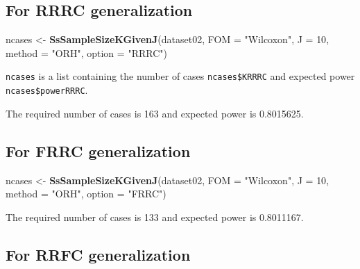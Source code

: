 \documentclass[]{book}
\newenvironment{Shaded}{\begin{snugshade}}{\end{snugshade}}
\newcommand{\CommentTok}[1]{\textcolor[rgb]{0.56,0.35,0.01}{\textit{#1}}}
\newcommand{\DataTypeTok}[1]{\textcolor[rgb]{0.13,0.29,0.53}{#1}}
\newcommand{\DecValTok}[1]{\textcolor[rgb]{0.00,0.00,0.81}{#1}}
\newcommand{\KeywordTok}[1]{\textcolor[rgb]{0.13,0.29,0.53}{\textbf{#1}}}
\newcommand{\NormalTok}[1]{#1}
\newcommand{\StringTok}[1]{\textcolor[rgb]{0.31,0.60,0.02}{#1}}
\begin{document}
\hypertarget{for-rrrc-generalization}{%
\subsection{For RRRC generalization}\label{for-rrrc-generalization}}

\begin{Shaded}
\begin{Highlighting}[]
\NormalTok{ncases <-}\StringTok{ }\KeywordTok{SsSampleSizeKGivenJ}\NormalTok{(dataset02, }\DataTypeTok{FOM =} \StringTok{"Wilcoxon"}\NormalTok{, }\DataTypeTok{J =} \DecValTok{10}\NormalTok{, }\DataTypeTok{method =} \StringTok{"ORH"}\NormalTok{, }\DataTypeTok{option =} \StringTok{"RRRC"}\NormalTok{)}
\end{Highlighting}
\end{Shaded}

\texttt{ncases} is a list containing the number of cases \texttt{ncases\$KRRRC} and expected power \texttt{ncases\$powerRRRC}.

\begin{Shaded}
\end{Shaded}

The required number of cases is 163 and expected power is 0.8015625.

\hypertarget{for-frrc-generalization}{%
\subsection{For FRRC generalization}\label{for-frrc-generalization}}

\begin{Shaded}
\begin{Highlighting}[]
\NormalTok{ncases <-}\StringTok{ }\KeywordTok{SsSampleSizeKGivenJ}\NormalTok{(dataset02, }\DataTypeTok{FOM =} \StringTok{"Wilcoxon"}\NormalTok{, }\DataTypeTok{J =} \DecValTok{10}\NormalTok{, }\DataTypeTok{method =} \StringTok{"ORH"}\NormalTok{, }\DataTypeTok{option =} \StringTok{"FRRC"}\NormalTok{)}
\end{Highlighting}
\end{Shaded}

The required number of cases is 133 and expected power is 0.8011167.

\hypertarget{for-rrfc-generalization}{%
\subsection{For RRFC generalization}\label{for-rrfc-generalization}}
\end{document}
